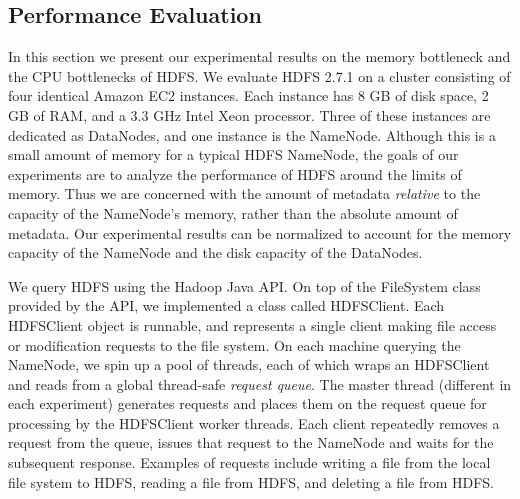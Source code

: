 \documentclass[11pt, a4paper]{article}
\begin{document}
\begin{multicols*}{2}
\section{Performance Evaluation}
In this section we present our experimental results on the memory bottleneck and the CPU bottlenecks of HDFS. We evaluate HDFS 2.7.1 on a cluster consisting of four identical Amazon EC2 instances. Each instance has 8 GB of disk space, 2 GB of RAM, and a 3.3 GHz Intel Xeon processor. Three of these instances are dedicated as DataNodes, and one instance is the NameNode. Although this is a small amount of memory for a typical HDFS NameNode, the goals of our experiments are to analyze the performance of HDFS around the limits of memory. Thus we are concerned with the amount of metadata \textit{relative} to the capacity of the NameNode's memory, rather than the absolute amount of metadata. Our experimental results can be normalized to account for the memory capacity of the NameNode and the disk capacity of the DataNodes.

We query HDFS using the Hadoop Java API. On top of the FileSystem class provided by the API, we implemented a class called HDFSClient. Each HDFSClient object is runnable, and represents a single client making file access or modification requests to the file system. On each machine querying the NameNode, we spin up a pool of threads, each of which wraps an HDFSClient and reads from a global thread-safe \textit{request queue}. The master thread (different in each experiment) generates requests and places them on the request queue for processing by the HDFSClient worker threads. Each client repeatedly removes a request from the queue, issues that request to the NameNode and waits for the subsequent response. Examples of requests include writing a file from the local file system to HDFS, reading a file from HDFS, and deleting a file from HDFS.


\end{multicols*}
\end{document}
